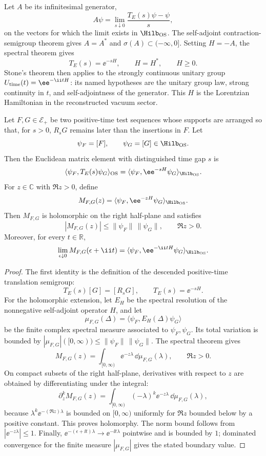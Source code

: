 Let \(A\) be its infinitesimal generator,
\[
  A\psi=\lim_{s\downarrow0}\frac{T_E(s)\psi-\psi}{s},
\]
on the vectors for which the limit exists in \(\Hilb_{\rm OS}\).  The
self-adjoint contraction-semigroup theorem gives \(A=A^*\) and
\(\sigma(A)\subset(-\infty,0]\).  Setting \(H=-A\), the spectral theorem gives
\[
  T_E(s)=\ee^{-sH},\qquad H=H^*,\qquad H\ge0 .
\]
Stone's theorem then applies to the strongly continuous unitary group
\(U_{\rm time}(t)=\ee^{-\ii tH}\): its named hypotheses are the unitary group
law, strong continuity in \(t\), and self-adjointness of the generator.  This
\(H\) is the Lorentzian Hamiltonian in the reconstructed vacuum sector.

\begin{proposition}
\label{prop:os-one-gap-semigroup-continuation}
Let \(F,G\in\mathcal E_+\) be two positive-time test sequences whose supports
are arranged so that, for \(s>0\), \(R_sG\) remains later than the insertions in
\(F\).  Let
\[
  \psi_F=[F],\qquad \psi_G=[G]\in\Hilb_{\rm OS}.
\]
Then the Euclidean matrix element with distinguished time gap \(s\) is
\[
  \langle \psi_F,T_E(s)\psi_G\rangle_{\rm OS}
  =
  \langle \psi_F,\ee^{-sH}\psi_G\rangle_{\Hilb_{\rm OS}} .
\]
For \(z\in\mathbb C\) with \(\Re z>0\), define
\[
  M_{F,G}(z)=\langle\psi_F,\ee^{-zH}\psi_G\rangle_{\Hilb_{\rm OS}} .
\]
Then \(M_{F,G}\) is holomorphic on the right half-plane and satisfies
\[
  |M_{F,G}(z)|\le \|\psi_F\|\,\|\psi_G\|,
  \qquad \Re z>0.
\]
Moreover, for every \(t\in\mathbb R\),
\[
  \lim_{\epsilon\downarrow0}M_{F,G}(\epsilon+\ii t)
  =
  \langle\psi_F,\ee^{-\ii tH}\psi_G\rangle_{\Hilb_{\rm OS}} .
\]
\end{proposition}

\begin{proof}
The first identity is the definition of the descended positive-time
translation semigroup:
\[
  T_E(s)[G]=[R_sG],
  \qquad T_E(s)=\ee^{-sH}.
\]
For the holomorphic extension, let \(E_H\) be the spectral resolution of the
nonnegative self-adjoint operator \(H\), and let
\[
  \mu_{F,G}(\Delta)=
  \langle \psi_F,E_H(\Delta)\psi_G\rangle
\]
be the finite complex spectral measure associated to \(\psi_F,\psi_G\).
Its total variation is bounded by
\(|\mu_{F,G}|([0,\infty))\le\|\psi_F\|\,\|\psi_G\|\).  The spectral theorem gives
\[
  M_{F,G}(z)=\int_{[0,\infty)}\ee^{-z\lambda}\,\dd\mu_{F,G}(\lambda),
  \qquad \Re z>0.
\]
On compact subsets of the right half-plane, derivatives with respect to \(z\)
are obtained by differentiating under the integral:
\[
  \partial_z^k M_{F,G}(z)
  =
  \int_{[0,\infty)}(-\lambda)^k\ee^{-z\lambda}\,
  \dd\mu_{F,G}(\lambda),
\]
because \(\lambda^k\ee^{-(\Re z)\lambda}\) is bounded on
\([0,\infty)\) uniformly for \(\Re z\) bounded below by a positive constant.
This proves holomorphy.  The norm bound follows from
\(|\ee^{-z\lambda}|\le1\).  Finally,
\(\ee^{-(\epsilon+\ii t)\lambda}\to\ee^{-\ii t\lambda}\) pointwise and is
bounded by \(1\); dominated convergence for the finite measure
\(|\mu_{F,G}|\) gives the stated boundary value.
\end{proof}


